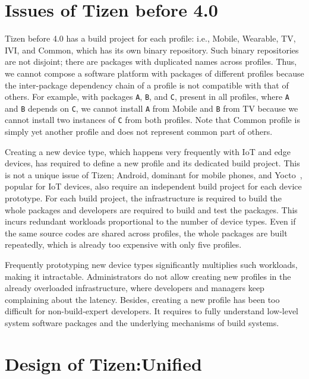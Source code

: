 \section{Issues of Tizen before 4.0}\label{S_IssueBefore4}

Tizen before 4.0 has a build project for each profile: i.e., Mobile, Wearable, TV, IVI, and Common, which has its own binary repository.
Such binary repositories are not disjoint; there are packages with duplicated names across profiles.
Thus, we cannot compose a software platform with packages of different profiles because the inter-package dependency chain of a profile is not compatible with that of others.
For example, with packages \texttt{A}, \texttt{B}, and \texttt{C}, present in all profiles, where \texttt{A} and \texttt{B} depends on \texttt{C}, we cannot install \texttt{A} from Mobile and \texttt{B} from TV because we cannot install two instances of \texttt{C} from both profiles.
Note that Common profile is simply yet another profile and does not represent common part of others.


Creating a new device type, which happens very frequently with IoT and edge devices, has required to define a new profile and its dedicated build project.
This is not a unique issue of Tizen; Android, dominant for mobile phones, and Yocto~\cite{Streif:2016:ELS:3051933}, popular for IoT devices, also require an independent build project for each device prototype.
For each build project, the infrastructure is required to build the whole packages and developers are required to build and test the packages.
This incurs redundant workloads proportional to the number of device types.
Even if the same source codes are shared across profiles, the whole packages are built repeatedly, which is already too expensive with only five profiles.


Frequently prototyping new device types significantly multiplies such workloads, making it intractable.
Administrators do not allow creating new profiles in the already overloaded infrastructure, where developers and managers keep complaining about the latency.
Besides, creating a new profile has been too difficult for non-build-expert developers.
It requires to fully understand low-level system software packages and the underlying mechanisms of build systems.


\section{Design of Tizen:Unified}\label{S_ach_build_unif}

